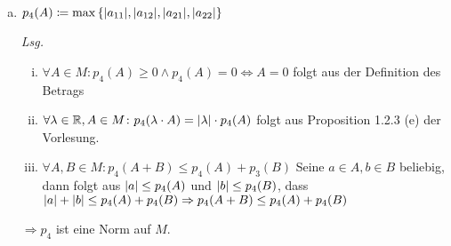 \documentclass{scrreprt}
\begin{document}
\begin{enumerate}[a)]
\item $p_4(A) \coloneqq \max\qty{\abs{a_{11}}, \abs{a_{12}}, \abs{a_{21}}, \abs{a_{22}}}$

  \textit{Lsg.}
  \begin{enumerate}[(i)]
  \item $\forall A \in M \colon p_4(A) \geq 0 \land p_4(A) = 0 \iff A = 0$ folgt aus der Definition des Betrags
  \item $\forall \lambda \in \mathbb{R}, A \in M \colon p_4(\lambda \cdot A) = \abs{\lambda} \cdot p_4(A)$
    folgt aus Proposition  1.2.3 (e) der Vorlesung.
  \item $\forall A, B \in M \colon p_4(A + B) \leq p_4(A) + p_3(B)$
    Seine $a \in A, b \in B$ beliebig, dann folgt aus
    $\abs{a} \leq p_4(A)$ und $\abs{b} \leq p_4(B)$, dass
    $\abs{a} + \abs{b} \leq p_4(A) + p_4(B) \Rightarrow p_4(A + B) \leq p_4(A) + p_4(B)$
  \end{enumerate}
  $\Rightarrow p_4$ ist eine Norm auf $M$.
\end{enumerate}
\end{document}
